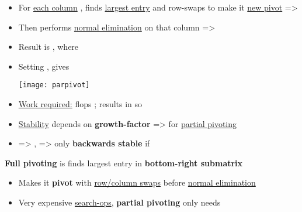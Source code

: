 \begin{itemize}

      \item
            For \underline{each column} , finds \underline{largest entry} and {row-swaps} to make
            it \underline{new pivot} => 
      \item
            Then performs \underline{normal elimination} on that column => 
      \item
            Result is ,
            where 
      \item
            Setting
            ,
             gives 

            \texttt{[image: parpivot]}
      \item
            \underline{Work required:}  flops
            ; results in  so 
      \item
            \underline{Stability} depends on \textbf{growth-factor}
            => for \underline{partial pivoting} 
      \item
             =>
            ,
            => only \textbf{backwards stable} if 
\end{itemize}

\hSep %

\textbf{Full pivoting} is  finds largest entry in \textbf{bottom-right submatrix}
\begin{itemize}
      \item
            Makes it \textbf{pivot} with \underline{row/column swaps} before \underline{normal elimination}
      \item
            Very expensive  \underline{search-ops}, \textbf{partial pivoting} only needs 
\end{itemize}


